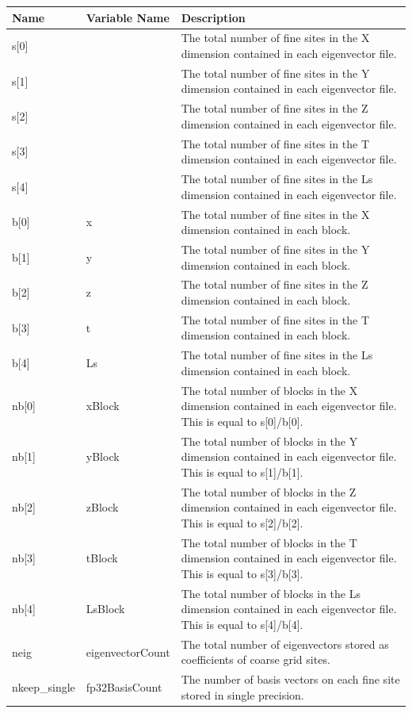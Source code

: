 \documentclass{article}
\begin{document}
\begin{longtable}{p{} |p{} |p{}}
\hline
Name & Variable Name & Description\\
\hline
s[0] &  & The total number of fine sites in the X dimension contained in each eigenvector file.\\
s[1] &  & The total number of fine sites in the Y dimension contained in each eigenvector file.\\
s[2] &  & The total number of fine sites in the Z dimension contained in each eigenvector file.\\
s[3] &  & The total number of fine sites in the T dimension contained in each eigenvector file.\\
s[4] &  & The total number of fine sites in the Ls dimension contained in each eigenvector file.\\
b[0] & \hfil x & The total number of fine sites in the X dimension contained in each block.\\
b[1] & \hfil y & The total number of fine sites in the Y dimension contained in each block.\\
b[2] & \hfil z & The total number of fine sites in the Z dimension contained in each block.\\
b[3] & \hfil t & The total number of fine sites in the T dimension contained in each block.\\
b[4] & \hfil Ls & The total number of fine sites in the Ls dimension contained in each block.\\
nb[0] & \hfil xBlock & The total number of blocks in the X dimension contained in each eigenvector file. This is equal to s[0]/b[0].\\
nb[1] & \hfil yBlock & The total number of blocks in the Y dimension contained in each eigenvector file. This is equal to s[1]/b[1].\\
nb[2] & \hfil zBlock & The total number of blocks in the Z dimension contained in each eigenvector file. This is equal to s[2]/b[2].\\
nb[3] & \hfil tBlock & The total number of blocks in the T dimension contained in each eigenvector file. This is equal to s[3]/b[3].\\
nb[4] & \hfil LsBlock & The total number of blocks in the Ls dimension contained in each eigenvector file. This is equal to s[4]/b[4].\\
neig & eigenvectorCount & The total number of eigenvectors stored as coefficients of coarse grid sites.\\
nkeep\_single & \hfil fp32BasisCount & The number of basis vectors on each fine site stored in single precision.\\

\end{longtable}
\end{document}
